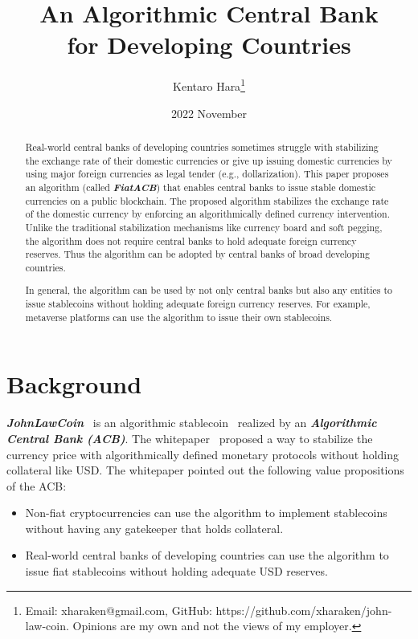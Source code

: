 \documentclass[dvipdfmx,a4paper]{article}
\title{\textbf{An Algorithmic Central Bank\\for Developing Countries}}
\author{Kentaro Hara\footnote{Email: xharaken@gmail.com, GitHub: https://github.com/xharaken/john-law-coin. Opinions are my own and not the views of my employer.}}
\date{2022 November}
\begin{document}
\maketitle

\begin{abstract}

Real-world central banks of developing countries sometimes struggle with stabilizing the exchange rate of their domestic currencies or give up issuing domestic currencies by using major foreign currencies as legal tender (e.g., dollarization). This paper proposes an algorithm (called \textit{\textbf{FiatACB}}) that enables central banks to issue stable domestic currencies on a public blockchain. The proposed algorithm stabilizes the exchange rate of the domestic currency by enforcing an algorithmically defined currency intervention. Unlike the traditional stabilization mechanisms like currency board and soft pegging, the algorithm does not require central banks to hold adequate foreign currency reserves. Thus the algorithm can be adopted by central banks of broad developing countries.

In general, the algorithm can be used by not only central banks but also any entities to issue stablecoins without holding adequate foreign currency reserves. For example, metaverse platforms can use the algorithm to issue their own stablecoins.

\end{abstract}

\section{Background}

\textit{\textbf{JohnLawCoin}}~\cite{johnlawcoin} is an algorithmic stablecoin~\cite{arner2020stablecoins,moin2020sok} realized by an \textit{\textbf{Algorithmic Central Bank (ACB)}}. The whitepaper~\cite{johnlawcoin} proposed a way to stabilize the currency price with algorithmically defined monetary protocols without holding collateral like USD. The whitepaper pointed out the following value propositions of the ACB:

\begin{itemize}
\item Non-fiat cryptocurrencies can use the algorithm to implement stablecoins without having any gatekeeper that holds collateral.
\item Real-world central banks of developing countries can use the algorithm to issue fiat stablecoins without holding adequate USD reserves.
\end{itemize}
\end{document}
